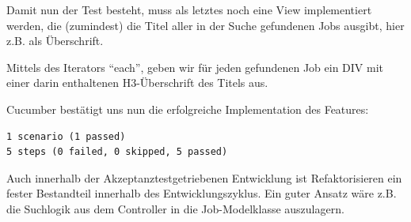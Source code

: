 Damit nun der Test besteht, muss als letztes noch eine View implementiert werden, die (zumindest) die Titel aller in der Suche gefundenen Jobs ausgibt, hier z.B. als Überschrift.
%                                                                                                                                          


                                                                                                  

Mittels des Iterators "`each"', geben wir für jeden gefundenen Job ein DIV mit einer darin enthaltenen H3-Überschrift des Titels aus.


\tddgreen

Cucumber bestätigt uns nun die erfolgreiche Implementation des Features:
\begin{lstlisting}
1 scenario (1 passed)
5 steps (0 failed, 0 skipped, 5 passed)
\end{lstlisting}


Auch innerhalb der Akzeptanztestgetriebenen Entwicklung ist Refaktorisieren ein fester Bestandteil innerhalb des Entwicklungszyklus.
Ein guter Ansatz wäre z.B. die Suchlogik aus dem Controller in die Job-Modelklasse auszulagern.

